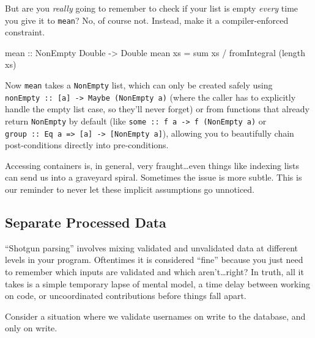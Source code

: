 \documentclass[]{article}
\newenvironment{Shaded}{}{}
\newcommand{\DataTypeTok}[1]{\textcolor[rgb]{0.56,0.13,0.00}{#1}}
\newcommand{\FunctionTok}[1]{\textcolor[rgb]{0.02,0.16,0.49}{#1}}
\newcommand{\NormalTok}[1]{#1}
\newcommand{\OperatorTok}[1]{\textcolor[rgb]{0.40,0.40,0.40}{#1}}
\newcommand{\OtherTok}[1]{\textcolor[rgb]{0.00,0.44,0.13}{#1}}
\begin{document}
But are you \emph{really} going to remember to check if your list is empty
\emph{every} time you give it to \texttt{mean}? No, of course not. Instead, make
it a compiler-enforced constraint.

\begin{Shaded}
\begin{Highlighting}[]
\OtherTok{mean ::} \DataTypeTok{NonEmpty} \DataTypeTok{Double} \OtherTok{{-}\textgreater{}} \DataTypeTok{Double}
\NormalTok{mean xs }\OtherTok{=} \FunctionTok{sum}\NormalTok{ xs }\OperatorTok{/} \FunctionTok{fromIntegral}\NormalTok{ (}\FunctionTok{length}\NormalTok{ xs)}
\end{Highlighting}
\end{Shaded}

Now \texttt{mean} takes a \texttt{NonEmpty} list, which can only be created
safely using
\texttt{nonEmpty\ ::\ {[}a{]}\ -\textgreater{}\ Maybe\ (NonEmpty\ a)} (where the
caller has to explicitly handle the empty list case, so they'll never forget) or
from functions that already return \texttt{NonEmpty} by default (like
\texttt{some\ ::\ f\ a\ -\textgreater{}\ f\ (NonEmpty\ a)} or
\texttt{group\ ::\ Eq\ a\ =\textgreater{}\ {[}a{]}\ -\textgreater{}\ {[}NonEmpty\ a{]}}),
allowing you to beautifully chain post-conditions directly into pre-conditions.

Accessing containers is, in general, very fraught\ldots even things like
indexing lists can send us into a graveyard spiral. Sometimes the issue is more
subtle. This is our reminder to never let these implicit assumptions go
unnoticed.

\subsection{Separate Processed Data}\label{separate-processed-data}

``Shotgun parsing'' involves mixing validated and unvalidated data at different
levels in your program. Oftentimes it is considered ``fine'' because you just
need to remember which inputs are validated and which aren't\ldots right? In
truth, all it takes is a simple temporary lapse of mental model, a time delay
between working on code, or uncoordinated contributions before things fall
apart.

Consider a situation where we validate usernames on write to the database, and
only on write.
\end{document}

